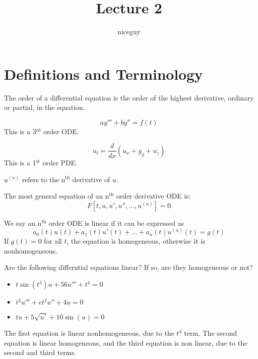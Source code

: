 \documentclass[12pt]{article}
\author{niceguy}
\title{Lecture 2}
\begin{document}
\maketitle

\section{Definitions and Terminology}

\begin{defn}
The order of a differential equation is the order of the highest derivative, ordinary or partial, in the equation.
\end{defn}

\begin{ex}
$$ay''' + by'' = f(t)$$
This is a 3$^{\text{rd}}$ order ODE.
\end{ex}

\begin{ex}
$$u_t = \frac{d}{dx}(u_x + y_y + u_z)$$
This is a 1$^{\text{st}}$ order PDE.
\end{ex}

\begin{defn}
$u^{(n)}$ refers to the n$^{\text{th}}$ derivative of $u$.
\end{defn}

The most general equation of an n$^{\text{th}}$ order derivative ODE is:
$$F[t, u, u', u'', \dots, u^{(n)}] = 0$$

\begin{defn}
We say an n$^{\text{th}}$ order ODE is linear if it can be expressed as
$$a_0(t)u(t) + a_1(t)u'(t) + \dots + a_n(t)u^{(n)}(t) = g(t)$$
If $g(t) = 0$ for all $t$, the equation is homogeneous, otherwise it is nonhomogeneous.
\end{defn}

\begin{ex}
Are the following differntial equations linear? If so, are they homogeneous or not?
\begin{itemize}
\item $t\sin(t^3) u + 56u''' + t^4 = 0$ \\
\item $t^3u''' + et^2u'' + 4u = 0$ \\
\item $tu + 5\sqrt{u'} + 10\sin(u) = 0$ \\
\end{itemize}
The first equation is linear nonhomogeneous, due to the $t^4$ term. The second equation is linear homogeneous, and the third equation is non linear, due to the second and third terms.
\end{ex}
\end{document}
